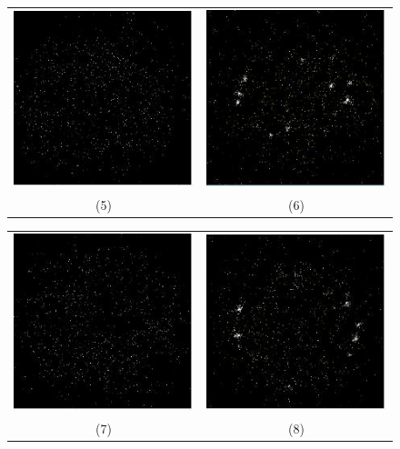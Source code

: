 \documentclass{gshs-hutech}
\begin{document}
\begin{figure}[h]
	\centering
	\begin{tabular}{cc}
		\includegraphics[scale=0.8]{c_5.jpg}&
		\includegraphics[scale=0.8]{c_6.jpg}\\
		(5) & (6)
	\end{tabular}
\end{figure} 

\begin{figure}[h]
	\centering
	\begin{tabular}{cc}
		\includegraphics[scale=0.8]{c_7.jpg}&
		\includegraphics[scale=0.8]{c_8.jpg}\\
		(7) & (8)
	\end{tabular}
\end{figure} 
\end{document}
